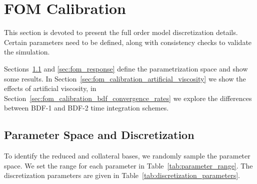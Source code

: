 \documentclass[../../thesis.tex]{subfiles}
\begin{document}
\section{FOM Calibration}
\label{sec:fom_calibration}
This section is devoted to present the full order model discretization details.
Certain parameters need to be defined,
along with consistency checks to validate the simulation.

Sections~\ref{sec:parameter_space_discretization} and \ref{sec:fom_response}
define the parametrization space and show some results.
In Section~\ref{sec:fom_calibration_artificial_viscosity} we show the effects of artificial viscosity,
in Section~\ref{sec:fom_calibration_bdf_convergence_rates} we explore the differences 
between BDF-1 and BDF-2 time integration schemes.


\subsection{Parameter Space and Discretization}
\label{sec:parameter_space_discretization}
To identify the reduced and collateral bases,
we randomly sample the parameter space.
We set the range for each parameter in Table~\ref{tab:parameter_range}.
The discretization parameters are given in Table~\ref{tab:discretization_parameters}.
\end{document}
